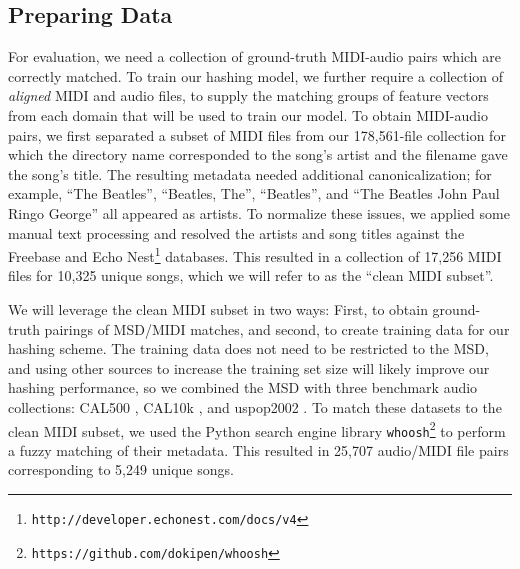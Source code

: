 \subsection{Preparing Data}
\label{sec:training_data}

For evaluation, we need a collection of ground-truth MIDI-audio pairs which are correctly matched.
To train our hashing model, we further require a collection of {\em aligned} MIDI and audio files, to supply the matching groups of feature vectors from each domain that will be used to train our model.
To obtain MIDI-audio pairs, we first separated a subset of MIDI files from our 178,561-file collection for which the directory name corresponded to the song's artist and the filename gave the song's title.
The resulting metadata needed additional canonicalization; for example, ``The Beatles'', ``Beatles, The'', ``Beatles'', and ``The Beatles John Paul Ringo George'' all appeared as artists.
To normalize these issues, we applied some manual text processing and resolved the artists and song titles against the Freebase \cite{bollacker2008freebase} and Echo Nest\footnote{\texttt{http://developer.echonest.com/docs/v4}} databases.
This resulted in a collection of 17,256 MIDI files for 10,325 unique songs, which we will refer to as the ``clean MIDI subset''.

We will leverage the clean MIDI subset in two ways: First, to obtain ground-truth pairings of MSD/MIDI matches, and second, to create training data for our hashing scheme.
The training data does not need to be restricted to the MSD, and using other sources to increase the training set size will likely improve our hashing performance, so we combined the MSD with three benchmark audio collections: CAL500 \cite{turnbull2007towards}, CAL10k \cite{tingle2010exploring}, and uspop2002 \cite{berenzweig2004large}.
To match these datasets to the clean MIDI subset, we used the Python search engine library \texttt{whoosh}\footnote{\texttt{https://github.com/dokipen/whoosh}} to perform a fuzzy matching of their metadata.
This resulted in 25,707 audio/MIDI file pairs corresponding to 5,249 unique songs.

